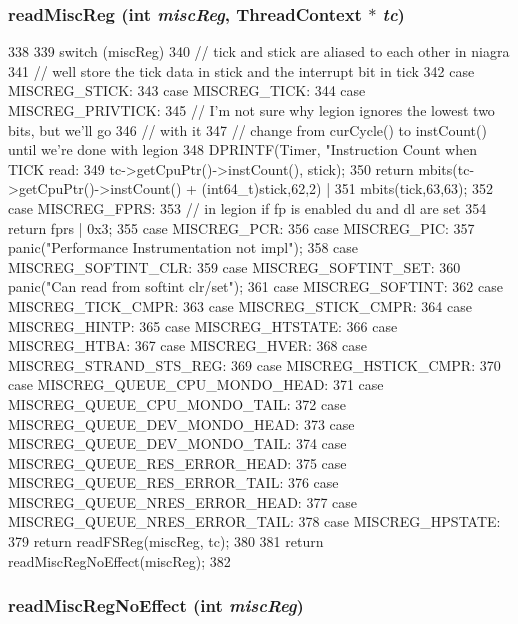 \hypertarget{classSparcISA_1_1ISA_ac9a5ba47c1dd9552c65c3164fba45f20}{
\subsubsection[{readMiscReg}]{ readMiscReg (int {\em miscReg}, \/  {\bf ThreadContext} $\ast$ {\em tc})}}
\label{classSparcISA_1_1ISA_ac9a5ba47c1dd9552c65c3164fba45f20}



\begin{DoxyCode}
338 {
339     switch (miscReg) {
340         // tick and stick are aliased to each other in niagra
341         // well store the tick data in stick and the interrupt bit in tick
342       case MISCREG_STICK:
343       case MISCREG_TICK:
344       case MISCREG_PRIVTICK:
345         // I'm not sure why legion ignores the lowest two bits, but we'll go
346         // with it
347         // change from curCycle() to instCount() until we're done with legion
348         DPRINTF(Timer, "Instruction Count when TICK read: %
349                 tc->getCpuPtr()->instCount(), stick);
350         return mbits(tc->getCpuPtr()->instCount() + (int64_t)stick,62,2) |
351                mbits(tick,63,63);
352       case MISCREG_FPRS:
353         // in legion if fp is enabled du and dl are set
354         return fprs | 0x3;
355       case MISCREG_PCR:
356       case MISCREG_PIC:
357         panic("Performance Instrumentation not impl\n");
358       case MISCREG_SOFTINT_CLR:
359       case MISCREG_SOFTINT_SET:
360         panic("Can read from softint clr/set\n");
361       case MISCREG_SOFTINT:
362       case MISCREG_TICK_CMPR:
363       case MISCREG_STICK_CMPR:
364       case MISCREG_HINTP:
365       case MISCREG_HTSTATE:
366       case MISCREG_HTBA:
367       case MISCREG_HVER:
368       case MISCREG_STRAND_STS_REG:
369       case MISCREG_HSTICK_CMPR:
370       case MISCREG_QUEUE_CPU_MONDO_HEAD:
371       case MISCREG_QUEUE_CPU_MONDO_TAIL:
372       case MISCREG_QUEUE_DEV_MONDO_HEAD:
373       case MISCREG_QUEUE_DEV_MONDO_TAIL:
374       case MISCREG_QUEUE_RES_ERROR_HEAD:
375       case MISCREG_QUEUE_RES_ERROR_TAIL:
376       case MISCREG_QUEUE_NRES_ERROR_HEAD:
377       case MISCREG_QUEUE_NRES_ERROR_TAIL:
378       case MISCREG_HPSTATE:
379         return readFSReg(miscReg, tc);
380     }
381     return readMiscRegNoEffect(miscReg);
382 }
\end{DoxyCode}
\hypertarget{classSparcISA_1_1ISA_a8147f1448b78d0de3f86766175429e19}{
\subsubsection[{readMiscRegNoEffect}]{ readMiscRegNoEffect (int {\em miscReg})}}
\label{classSparcISA_1_1ISA_a8147f1448b78d0de3f86766175429e19}


